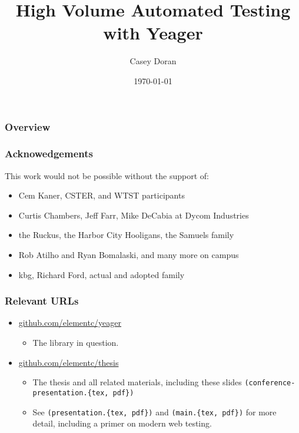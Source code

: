 \documentclass{beamer}
\title[Yeager]{High Volume Automated Testing with Yeager}
\author{Casey Doran}
\institute[Florida Tech]
{
Florida Institute of Technology \\
\medskip
\textit{cdoran2011@my.fit.edu}
}
\date{\today}
\begin{document}
\begin{frame}
\titlepage
\end{frame}

\begin{frame}
\frametitle{Overview}
\tableofcontents
\end{frame}

\begin{frame}
  \frametitle{Acknowedgements}
  This work would not be possible without the support of:
  \begin{itemize}
    \item Cem Kaner, CSTER, and WTST participants
    \item Curtis Chambers, Jeff Farr, Mike DeCabia at Dycom Industries
    \item the Ruckus, the Harbor City Hooligans, the Samuels family
    \item Rob Atilho and Ryan Bomalaski, and many more on campus
    \item kbg, Richard Ford, actual and adopted family
  \end{itemize}
\end{frame}


\begin{frame}
  \frametitle{Relevant URLs}
  \begin{itemize}
    \item \url{github.com/elementc/yeager}
    \begin{itemize}
      \item The library in question.
    \end{itemize}
    \item \url{github.com/elementc/thesis}
    \begin{itemize}
      \item The thesis and all related materials, including these slides \texttt{(conference-presentation.\{tex, pdf\})}
      \item See \texttt{(presentation.\{tex, pdf\})} and \texttt{(main.\{tex, pdf\})} for more detail, including a primer on modern web testing.

    \end{itemize}
  \end{itemize}
\end{frame}
\end{document}
